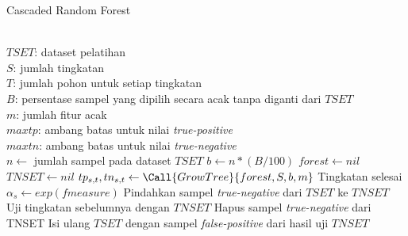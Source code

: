 \begin{algorithm}[h]
\caption{Cascaded Random Forest}
\label{alg:crf}
	\begin{algorithmic}[1]
\Require \\
$ TSET $: dataset pelatihan \\
$ S $: jumlah tingkatan \\
$ T $: jumlah pohon untuk setiap tingkatan \\
$ B $: persentase sampel yang dipilih secara acak tanpa diganti dari $TSET$ \\
$ m $: jumlah fitur acak \\
$ maxtp $: ambang batas untuk nilai \textit{true-positive} \\
$ maxtn $: ambang batas untuk nilai \textit{true-negative}
\\
	\State $ n \gets $ jumlah sampel pada dataset $ TSET $
	\State $ b \gets n * (B / 100) $
	\State $ forest \gets nil $
	\State $ TNSET \gets nil $
			\State $ tp_{s,t}, tn_{s,t} \gets \Call{GrowTree}{forest, S, b, m} $
				\State Tingkatan selesai
			\EndIf
		\EndFor
		\State $\alpha_{s} \gets exp(fmeasure) $
			\State Pindahkan sampel \textit{true-negative} dari
			$TSET$ ke $TNSET$
		\Else
			\State Uji tingkatan sebelumnya dengan $TNSET$
			\State Hapus sampel \textit{true-negative} dari TNSET
			\State Isi ulang $TSET$ dengan sampel
			\textit{false-positive} dari hasil uji $TNSET$
		\EndIf
	\EndFor
\EndFunction

	\end{algorithmic}
\end{algorithm}
